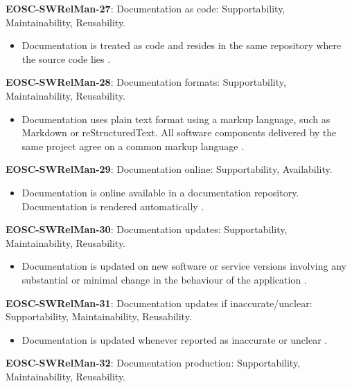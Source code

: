 \textbf{EOSC-SWRelMan-27}: Documentation as code: Supportability, Maintainability, Reusability.

\begin{itemize}
    \item Documentation is treated as code and resides in the same repository where the source code lies \cite{orviz_set_2017}.
\end{itemize}

\textbf{EOSC-SWRelMan-28}: Documentation formats: Supportability, Maintainability, Reusability.

\begin{itemize}
    \item Documentation uses plain text format using a markup language, such as Markdown or reStructuredText. All software components delivered by the same project agree on a common markup language \cite{orviz_set_2017,raymond_software_2013}.
\end{itemize}

\textbf{EOSC-SWRelMan-29}: Documentation online: Supportability, Availability.

\begin{itemize}
    \item Documentation is online available in a documentation repository. Documentation is rendered automatically \cite{orviz_set_2017,orviz_fernandez_eosc-synergy_2020}.
\end{itemize}

\textbf{EOSC-SWRelMan-30}: Documentation updates: Supportability, Maintainability, Reusability.

\begin{itemize}
    \item Documentation is updated on new software or service versions involving any substantial or minimal change in the behaviour of the application \cite{orviz_set_2017,orviz_fernandez_eosc-synergy_2020,raymond_software_2013}.
\end{itemize}

\textbf{EOSC-SWRelMan-31}: Documentation updates if inaccurate/unclear: Supportability, Maintainability, Reusability.

\begin{itemize}
    \item Documentation is updated whenever reported as inaccurate or unclear \cite{orviz_set_2017,orviz_fernandez_eosc-synergy_2020}.
\end{itemize}

\textbf{EOSC-SWRelMan-32}: Documentation production: Supportability, Maintainability, Reusability.

